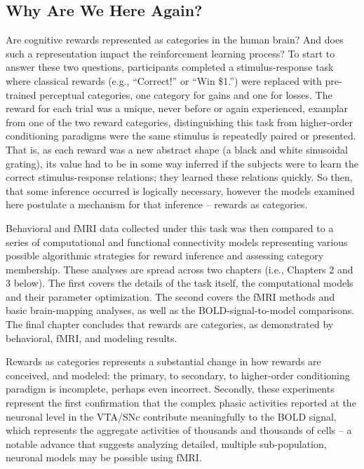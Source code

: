 \subsection{Why Are We Here Again?}
\label{sub:goals}
Are cognitive rewards represented as categories in the human brain?  And does such a representation impact the reinforcement learning process?  To start to answer these two questions, participants completed a stimulus-response task where classical rewards (e.g., ``Correct!'' or ``Win \$1.'') were replaced with pre-trained perceptual categories, one category for gains and one for losses.  The reward for each trial was a unique, never before or again experienced, examplar from one of the two reward categories, distinguishing this task from higher-order conditioning paradigms were the same stimulus is repeatedly paired or presented.  That is, as each reward was a new abstract shape (a black and white sinusoidal grating), its value had to be in some way inferred if the subjects were to learn the correct stimulus-response relations; they learned these relations quickly.  So then, that some inference occurred is logically necessary, however the models examined here postulate a mechanism for that inference -- rewards as categories.  

Behavioral and fMRI data collected under this task was then compared to a series of computational and functional connectivity models representing various possible algorithmic strategies for reward inference and assessing category membership.  These analyses are spread across two chapters (i.e., Chapters 2 and 3 below).  The first covers the details of the task itself, the computational models and their parameter optimization.  The second covers the fMRI methods and basic brain-mapping analyses, as well as the BOLD-signal-to-model comparisons.  The final chapter concludes that rewards are categories, as demonstrated by behavioral, fMRI, and modeling results.  

Rewards as categories represents a substantial change in how rewards are conceived, and modeled: the primary, to secondary, to higher-order conditioning paradigm is incomplete, perhaps even incorrect.   Secondly, these experiments represent the first confirmation that the complex phasic activities reported at the neuronal level in the VTA/SNc \cite{Kim:2006p1063, Matsumoto:2009p7219,Smith:2011p9101} contribute meaningfully to the BOLD signal, which represents the aggregate activities of thousands and thousands of cells -- a notable advance that suggests analyzing detailed, multiple sub-population, neuronal models may be possible using fMRI.
\clearpage